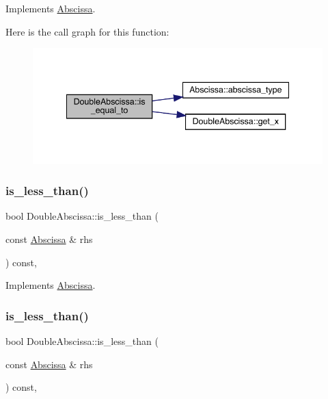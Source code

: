 Implements \mbox{\hyperlink{classAbscissa_a4adf4055c1eee010f9493e0ebb66348a}{Abscissa}}.

Here is the call graph for this function\+:
\nopagebreak
\begin{figure}[H]
\begin{center}
\leavevmode
\includegraphics[width=341pt]{d4/ded/classDoubleAbscissa_ac62533c5fa000e272ad818c0afe7f02b_cgraph}
\end{center}
\end{figure}
\mbox{\label{classDoubleAbscissa_acf3a2bfc6b2c43a7a84310943b81849d}} 
\subsubsection{\texorpdfstring{is\_less\_than()}{is\_less\_than()}\hspace{0.1cm}{\footnotesize\ttfamily [1/2]}}
{\footnotesize\ttfamily bool Double\+Abscissa\+::is\+\_\+less\+\_\+than (\begin{DoxyParamCaption}\item[{const \mbox{\hyperlink{classAbscissa}{Abscissa}} \&}]{rhs }\end{DoxyParamCaption}) const\hspace{0.3cm}{\ttfamily [inline]}, {\ttfamily [virtual]}}



Implements \mbox{\hyperlink{classAbscissa_a399c2f7a1309368b477c767ff5f63927}{Abscissa}}.

\mbox{\label{classDoubleAbscissa_acf3a2bfc6b2c43a7a84310943b81849d}} 
\subsubsection{\texorpdfstring{is\_less\_than()}{is\_less\_than()}\hspace{0.1cm}{\footnotesize\ttfamily [2/2]}}
{\footnotesize\ttfamily bool Double\+Abscissa\+::is\+\_\+less\+\_\+than (\begin{DoxyParamCaption}\item[{const \mbox{\hyperlink{classAbscissa}{Abscissa}} \&}]{rhs }\end{DoxyParamCaption}) const\hspace{0.3cm}{\ttfamily [inline]}, {\ttfamily [virtual]}}



